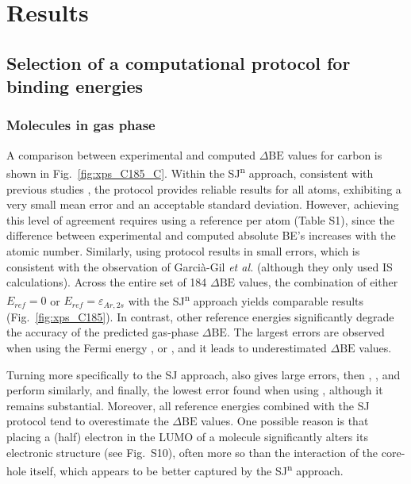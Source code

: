 \documentclass[%
aip,
amsmath,amssymb,
preprint,%
jcp,
showkeys,
]{revtex4-2}
\def\dbe{\ensuremath{\Delta\text{BE}}}
\begin{document}
\clearpage



\section{Results}\label{sec:results}


\subsection{Selection of a computational protocol for binding energies}\label{sec:proto}

\subsubsection{Molecules in gas phase}

A comparison between experimental and computed \dbe{} values for carbon is shown in Fig.~\ref{fig:xps_C185_C}. Within the SJ\textsuperscript{n} approach, consistent with previous studies \cite{pueyobellafontPredictingCoreLevel2017,golzeAccurateAbsoluteRelative2020}, the  protocol provides reliable results for all atoms, exhibiting a very small mean error and an acceptable standard deviation. However, achieving this level of agreement requires using a reference per atom (Table S1), since the difference between experimental and computed absolute BE's increases with the atomic number. Similarly, using  protocol results in small errors, which is consistent with the observation of Garcià-Gil \textit{et al.}\cite{garcia-gilCalculationCoreLevel2012} (although they only used IS calculations). Across the entire set of 184 \dbe{} values, the combination of either $E_{ref}=0$ or $E_{ref}=\varepsilon_{Ar,2s}$ with the SJ\textsuperscript{n} approach yields comparable results (Fig.~\ref{fig:xps_C185}). In contrast, other reference energies significantly degrade the accuracy of the predicted gas-phase \dbe{}. The largest errors are observed when using the Fermi energy , or , and it leads to underestimated \dbe{} values. 

Turning more specifically to the SJ approach,  also gives large errors, then , , and  perform similarly, and finally, the lowest error found when using \cpx{\phi}, although it remains substantial. Moreover, all reference energies combined with the SJ protocol tend to overestimate the \dbe{} values. One possible reason is that placing a (half) electron in the LUMO of a molecule significantly alters its electronic structure (see Fig.~S10), often more so than the interaction of the core-hole itself, which appears to be better captured by the SJ\textsuperscript{n} approach.\cite{taucherFinalStateSimulationsCoreLevel2020}
\end{document}

